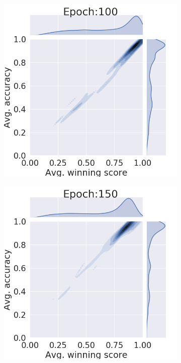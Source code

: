 \documentclass{article}
\begin{document}
\begin{figure}[htb]
\begin{subfigure}[b]{0.19\textwidth}
         \caption{}
     \end{subfigure}
     \hfill
     \begin{subfigure}[b]{0.19\textwidth}
         \centering
         \noindent\includegraphics[width=\textwidth]{images/joint_plot/mixup/100.png}
         \caption{}
     \end{subfigure}
          \centering
     \begin{subfigure}[b]{0.19\textwidth}
         \centering
         \noindent\includegraphics[width=\textwidth]{images/joint_plot/mixup/150.png}

\end{subfigure}
\end{figure}
\end{document}
